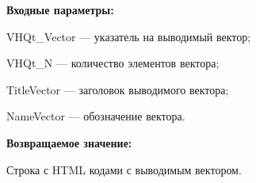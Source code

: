 \textbf{Входные параметры:}
 
    VHQt\_Vector --- указатель на выводимый вектор;
 
    VHQt\_N --- количество элементов вектора;
 
    TitleVector --- заголовок выводимого вектора;
 
    NameVector --- обозначение вектора.

\textbf{Возвращаемое значение:}

 
    Строка с HTML кодами с выводимым вектором.